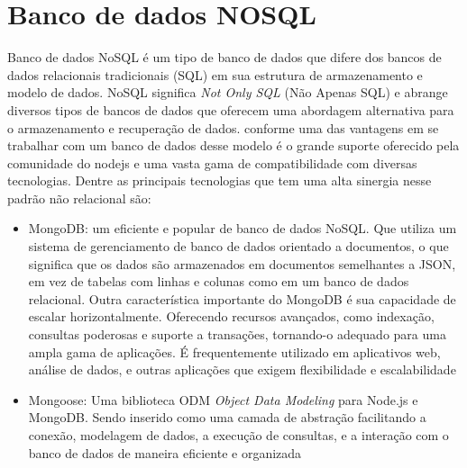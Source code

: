 \section{Banco de dados NOSQL}
Banco de dados NoSQL é um tipo de banco de dados que difere dos bancos de dados relacionais tradicionais (SQL) em sua estrutura de armazenamento e modelo de dados. NoSQL significa \textit{Not Only SQL} (Não Apenas SQL) e abrange diversos tipos de bancos de dados que oferecem uma abordagem alternativa para o armazenamento e recuperação de dados.
conforme \cite{pereira2014aplicações} uma das vantagens em se trabalhar com um banco de dados desse modelo é o grande suporte oferecido pela comunidade do nodejs e uma vasta gama de compatibilidade com diversas tecnologias.
Dentre as principais tecnologias que tem uma alta sinergia nesse padrão não relacional são: 


\begin{itemize}
    \item MongoDB: um eficiente e popular de banco de dados NoSQL. Que utiliza um sistema de gerenciamento de banco de dados orientado a documentos, o que significa que os dados são armazenados em documentos semelhantes a JSON, em vez de tabelas com linhas e colunas como em um banco de dados relacional.\cite{pereira2014aplicações}
    Outra característica importante do MongoDB é sua capacidade de escalar horizontalmente. Oferecendo recursos avançados, como indexação, consultas poderosas e suporte a transações, tornando-o adequado para uma ampla gama de aplicações. É frequentemente utilizado em aplicativos web, análise de dados, e outras aplicações que exigem flexibilidade e escalabilidade \cite{pereira2014aplicações}
    \item Mongoose:  Uma biblioteca ODM \textit{Object Data Modeling} para Node.js e MongoDB. Sendo inserido como uma camada de abstração facilitando a conexão, modelagem de dados, a execução de consultas, e a interação com o banco de dados de maneira eficiente e organizada\cite{pereira2014aplicações}

\end{itemize}



